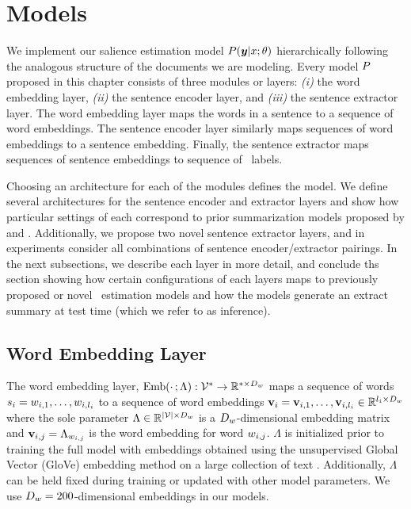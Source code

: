 \section{Models}

We implement our salience estimation model $P(\boldsymbol{y}|x;\theta)$ 
hierarchically following the analogous structure of the documents we are 
modeling.  Every model $P$ proposed in this chapter consists of three modules
or layers: \textit{(i)} the word embedding layer, \textit{(ii)} the sentence
encoder layer, and \textit{(iii)} the sentence extractor layer. 
The word embedding layer maps the words in a sentence to a sequence of 
word embeddings. The sentence encoder layer similarly maps sequences of 
word embeddings to a sentence embedding. Finally, the sentence extractor 
maps sequences of sentence embeddings to sequence of \salience~labels.

Choosing
an architecture for each of the modules defines the model. We define several
architectures for the sentence encoder and extractor layers and show how
particular settings of each correspond to prior summarization models proposed 
by \citet{cheng2016neural} and \citet{nallapati2017summarunner}. 
Additionally, we propose two novel sentence extractor layers, 
and in experiments 
consider all combinations of sentence encoder/extractor pairings.
In the next subsections, we 
describe each layer in more detail, and conclude ths section showing
how certain configurations of each layers maps to previously proposed or
novel \salience~estimation models and how the models generate an extract 
summary at test time (which we refer to as inference).

\subsection{Word Embedding Layer}

    The word embedding layer, $\operatorname{Emb}(\cdot\,;\Lambda) : \mathcal{V}^* \rightarrow \mathbb{R}^{* \times D_{w}}$ maps a sequence of words $s_i = w_{i,1},\ldots,
w_{i,l_i}$ to a sequence of word embeddings $\mathbf{v}_i = \mathbf{v}_{i,1},
\ldots, \mathbf{v}_{i,l_i} \in \mathbb{R}^{l_i \times D_{w}}$
where the sole parameter $\Lambda \in \mathbb{R}^{|\mathcal{V}| \times D_{w}}$ 
is a $D_{w}$-dimensional embedding matrix and $\mathbf{v}_{i,j} = \Lambda_{w_{i,j}}$ is the word embedding for word $w_{i,j}$.
$\Lambda$ is initialized prior to training the full model with 
embeddings obtained using the unsupervised Global Vector (GloVe) embedding 
method on a large collection of text \citep{pennington2014glove}. 
Additionally, $\Lambda$ can be held fixed during training or updated 
with other model parameters. We use $D_{w} = 200$-dimensional embeddings
in our models.







